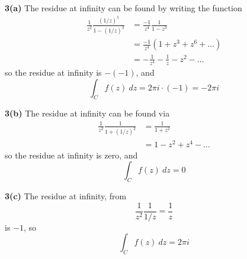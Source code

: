 \documentclass{article}
\begin{document}
\textbf{3(a)}
The residue at infinity can be found by writing the function
\begin{align*}
	\frac{1}{z^2} \frac{(1 / z)^5}{1 - (1/z)^3}
	&= \frac{-1}{z^4} \frac{1}{1 - z^3} \\
	&= \frac{-1}{z^4} \left(1 + z^3 + z^6 + \dots \right) \\
	&= -\frac{1}{z^4} - \frac{1}{z} - z^2 - \dots
\end{align*}
so the residue at infinity is $- (-1)$, and
\[
	\int_C f(z)~dz = 2\pi i \cdot (-1) = -2\pi i
\] 

\textbf{3(b)}
The residue at infinity can be found via
\begin{align*}
	\frac{1}{z^2} \frac{1}{1 + (1/z)^2} 
	&= \frac{1}{1 + z^2} \\
	&= 1 - z^2 + z^4 - \dots
\end{align*}
so the residue at infinity is zero, and
\[
	\int_C f(z)~dz = 0
\]

\textbf{3(c)}
The residue at infinity, from 
\[
	\frac{1}{z^2} \frac{1}{1/z}
	= \frac{1}{z} 
\]
is $-1$, so
\[
	\int_C f(z)~dz = 2\pi i
\]
\end{document}
